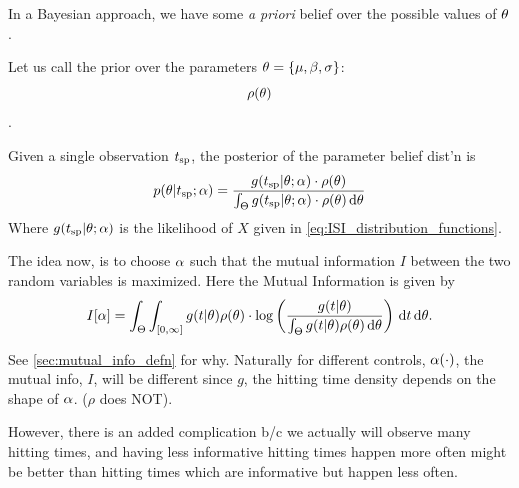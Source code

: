 % 
% 
% 

In a Bayesian approach, we have some {\sl a priori} belief over the possible
values of ${ \theta}$.

Let us call the prior over the parameters ${ \theta} = \{{\mu }, \beta, \sigma\}$:
$$\rho({ \theta})$$.

Given a single observation ${ t_{\textrm{sp} } }$, the posterior of the parameter belief dist'n
is 
\begin{equation}
p({ \theta}| { t_{\textrm{sp} } }; \alpha) =
\frac{g({ t_{\textrm{sp} } } |{ \theta}; \alpha)\cdot \rho({ \theta})}{\int_\Theta g({ t_{\textrm{sp} } }|{ \theta}; \alpha)\cdot \rho({ \theta})
\, \mathrm{d} { \theta}}
\label{eq:parameter_posterior_defn}
\end{equation} 
Where $ g( { t_{\textrm{sp} } } |{ \theta}; \alpha)$ is the likelihood of $X$ given in
\cref{eq:ISI_distribution_functions}.

The idea now, is to choose $\alpha$ such that the mutual information $I$ between the
two random variables is maximized. Here the Mutual Information is given by
\begin{equation}
I[\alpha]= 
\int_\Theta \int_{[0, \infty]} g(t|{ \theta})\rho({ \theta}) \cdot 
\log \left( \frac{g(t|{ \theta})}
{\int_\Theta g(t|{ \theta})\rho({ \theta}) \, \mathrm{d} { \theta}   } \right)
\, \mathrm{d} t\, \mathrm{d} { \theta}.
\label{eq:J_mutual_info_objective}
\end{equation}

See \cref{sec:mutual_info_defn} for why. 
Naturally for different controls, $\alpha(\cdot)$, the mutual info, $I$, will
be different since $g$, the hitting time density depends on the shape of $\alpha$.
($\rho$ does NOT).

However, there is an added complication b/c we actually will observe many
hitting times, and having less informative hitting times happen more often might
be better than hitting times which are informative but happen less often. 

